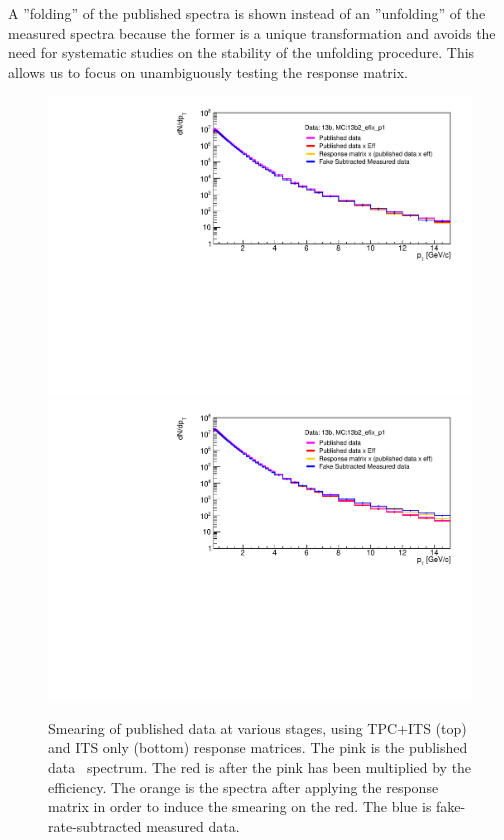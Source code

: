 A ''folding'' of the published spectra is shown instead of an ''unfolding'' of the measured spectra because the former is a unique transformation and avoids the need for systematic studies on the stability of the unfolding procedure. This allows us to focus on unambiguously testing the response matrix. 

\begin{figure}[htpb]
\centering
\includegraphics[width=.95\textwidth]{Data_Analysis/Tracking/refolding_pPb_tpc_MBMC_0GeV15GeV_dNdpt.pdf}
\includegraphics[width=.95\textwidth]{Data_Analysis/Tracking/refolding_pPb_its_MBMC_0GeV15GeV_dNdpt.pdf}
\caption{Smearing of published data at various stages, using TPC+ITS (top) and ITS only (bottom) response matrices. The pink is the published data \pt~spectrum. The red is after the pink has been multiplied by the efficiency. The orange is the spectra after applying the response matrix in order to induce the smearing on the red. The blue is fake-rate-subtracted measured data.}
\label{fig:RefoldedComparisonSpectra}
\end{figure}

